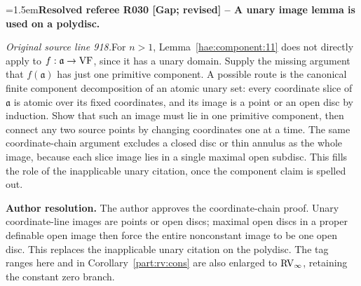 \documentclass[12pt]{amsart}
\newcommand{\ResolvedRefereeRemark}[5]{%
  \par\medskip\begingroup\normalfont\small\color{gray}%
  \emergencystretch=1.5em\noindent\textbf{Resolved referee R#1 [#2] -- #3.}\par\nobreak\noindent #4\par
  \medskip\color{ResolutionGreen}\noindent\textbf{Author resolution.} #5\par
  \endgroup\medskip
}
\theoremstyle{plain}
\theoremstyle{definition}
\theoremstyle{remark}
\numberwithin{equation}{section}
\theoremstyle{plain}
\newcommand{\VF}{\textup{VF}}
\newcommand{\RV}{\textup{RV}}
\newcommand{\ga}{\mathfrak{a}}
\newcommand{\0}{\emptyset}
\begin{document}
\ResolvedRefereeRemark{030}{Gap; revised}{A unary image lemma is used on a polydisc}{%
\textit{Original source line 918.}\quad For $n>1$, Lemma~\ref{hae:component:11} does not directly apply to $f:\ga\to\VF$, since it has a unary domain. Supply the missing argument that $f(\ga)$ has just one primitive component. A possible route is the canonical finite component decomposition of an atomic unary set: every coordinate slice of $\ga$ is atomic over its fixed coordinates, and its image is a point or an open disc by induction. Show that such an image must lie in one primitive component, then connect any two source points by changing coordinates one at a time. The same coordinate-chain argument excludes a closed disc or thin annulus as the whole image, because each slice image lies in a single maximal open subdisc. This fills the role of the inapplicable unary citation, once the component claim is spelled out.
}{The author approves the coordinate-chain proof. Unary coordinate-line images are points or open discs; maximal open discs in a proper definable open image then force the entire nonconstant image to be one open disc. This replaces the inapplicable unary citation on the polydisc. The tag ranges here and in Corollary~\ref{part:rv:cons} are also enlarged to $\RV_\infty$, retaining the constant zero branch.}
\end{document}
